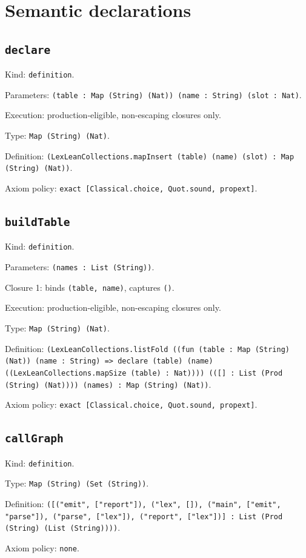 \documentclass[11pt]{article}
\begin{document}
\section*{Semantic declarations}
\subsection*{\texttt{declare}}
\noindent Kind: \texttt{definition}.\par
\noindent Parameters: \texttt{(table : Map (String) (Nat)) (name : String) (slot : Nat)}.\par
\noindent Execution: production-eligible, non-escaping closures only.\par
\noindent Type: \texttt{Map (String) (Nat)}.\par
\noindent Definition: \texttt{(LexLeanCollections.mapInsert (table) (name) (slot) : Map (String) (Nat))}.\par
\noindent Axiom policy: \texttt{exact [Classical.choice, Quot.sound, propext]}.\par
\subsection*{\texttt{buildTable}}
\noindent Kind: \texttt{definition}.\par
\noindent Parameters: \texttt{(names : List (String))}.\par
\noindent Closure 1: binds \texttt{(table, name)}, captures \texttt{()}.\par
\noindent Execution: production-eligible, non-escaping closures only.\par
\noindent Type: \texttt{Map (String) (Nat)}.\par
\noindent Definition: \texttt{(LexLeanCollections.listFold ((fun (table : Map (String) (Nat)) (name : String) => declare (table) (name) ((LexLeanCollections.mapSize (table) : Nat)))) (([] : List (Prod (String) (Nat)))) (names) : Map (String) (Nat))}.\par
\noindent Axiom policy: \texttt{exact [Classical.choice, Quot.sound, propext]}.\par
\subsection*{\texttt{callGraph}}
\noindent Kind: \texttt{definition}.\par
\noindent Type: \texttt{Map (String) (Set (String))}.\par
\noindent Definition: \texttt{([("emit", ["report"]), ("lex", []), ("main", ["emit", "parse"]), ("parse", ["lex"]), ("report", ["lex"])] : List (Prod (String) (List (String))))}.\par
\noindent Axiom policy: \texttt{none}.\par
\end{document}
